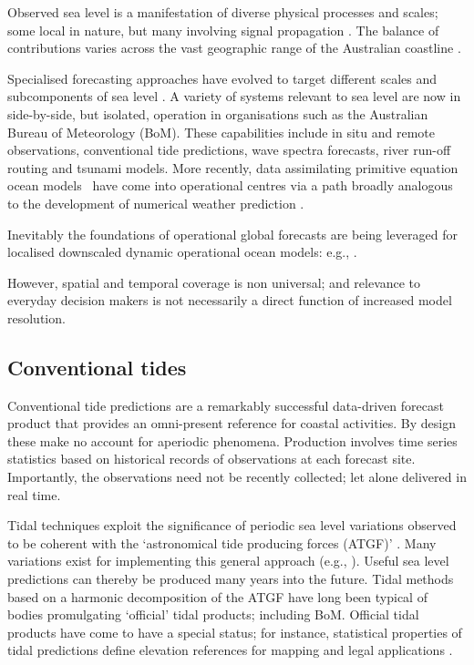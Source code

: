 Observed sea level is a manifestation of diverse physical processes and scales; some local in nature, but many involving signal propagation \citep{Melet:2016dd}.
The balance of contributions varies across the vast geographic range of the Australian coastline \citep{Haigh:2013bn,Haigh:2013he,Woodham:2013cl,Ridgway:2004kb,Church:1986tl,Allen:2009tf}.

Specialised forecasting approaches have evolved to target different scales and subcomponents of sea level \citep{Cartwright:2000tt,Petersen:2012kp}.
A variety of systems relevant to sea level are now in side-by-side, but isolated, operation in organisations such as the Australian Bureau of Meteorology (BoM). 
These capabilities include in situ and remote observations, conventional tide predictions, wave spectra forecasts, river run-off routing and tsunami models. 
More recently, data assimilating primitive equation ocean models~\citep{Schiller:2011dia} have come into operational centres via a path broadly analogous to the development of numerical weather prediction \citep{Harper:kb}. 

Inevitably the foundations of operational global forecasts are being leveraged for localised downscaled dynamic operational ocean models: e.g., \citep{Paramygin:2017dx,Yang:2016ep,Wei:2014ex,Peng:2014kq}.

However, spatial and temporal coverage is non universal; and relevance to everyday decision makers is not necessarily a direct function of increased model resolution.  


\subsection{Conventional tides}
\label{sec:tide_intro}

Conventional tide predictions are a remarkably successful data-driven forecast product that provides an omni-present reference for coastal activities.
By design these make no account for aperiodic phenomena. 
Production involves time series statistics based on historical records of observations at each forecast site.
Importantly, the observations need not be recently collected; let alone delivered in real time.

Tidal techniques exploit the significance of periodic sea level variations observed to be coherent with the `astronomical tide producing forces (ATGF)' \citep{Hendershott:1981ub}.     
Many variations exist for implementing this general approach (e.g., \citep{Foreman:2009bg,Groves:1975ky,LEFFLER:2009ej,Smith:1997ut} ). 
Useful sea level predictions can thereby be produced many years into the future.  
Tidal methods based on a harmonic decomposition of the ATGF have long been typical of bodies promulgating `official' tidal products; including BoM.
Official tidal products have come to have a special status; for instance, statistical properties of tidal predictions define elevation references for mapping and legal applications \citep{PCTMSL-sp9}.

